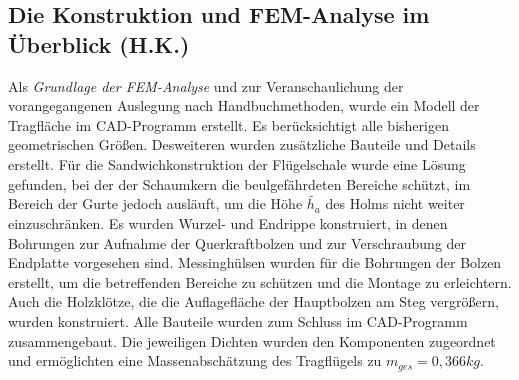 \subsection{Die Konstruktion und FEM-Analyse im Überblick (H.K.)}
Als \textit{Grundlage der FEM-Analyse} und zur Veranschaulichung der vorangegangenen Auslegung nach Handbuchmethoden, wurde ein Modell der Tragfläche im CAD-Programm erstellt. Es berücksichtigt alle bisherigen geometrischen Größen. Desweiteren wurden zusätzliche Bauteile und Details erstellt. Für die Sandwichkonstruktion der Flügelschale wurde eine Lösung gefunden, bei der der Schaumkern die beulgefährdeten Bereiche schützt, im Bereich der Gurte jedoch ausläuft, um die Höhe $ \tilde{h_{a}} $ des Holms nicht weiter einzuschränken. Es wurden Wurzel- und Endrippe konstruiert, in denen Bohrungen zur Aufnahme der Querkraftbolzen und zur Verschraubung der Endplatte vorgesehen sind. Messinghülsen wurden für die Bohrungen der Bolzen erstellt, um die betreffenden Bereiche zu schützen und die Montage zu erleichtern. Auch die Holzklötze, die die Auflagefläche der Hauptbolzen am Steg vergrößern, wurden konstruiert. Alle Bauteile wurden zum Schluss im CAD-Programm zusammengebaut. Die jeweiligen Dichten wurden den Komponenten zugeordnet und ermöglichten eine Massenabschätzung des Tragflügels zu $ m_{ges}=0,366kg $. \\


